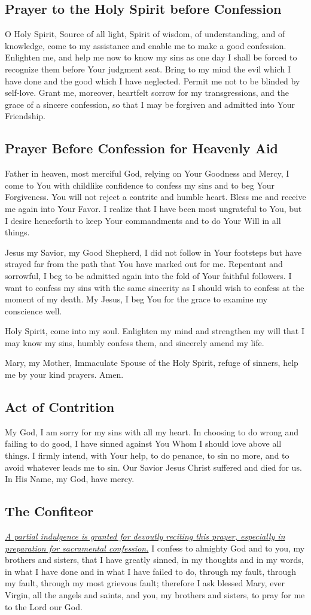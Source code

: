\documentclass[12pt]{article}
\newcommand{\prayertitle}[1]{\subsection{#1}}
\newcommand{\indulgencedprayertitle}[1]{\prayertitle{#1 \protect\kreuz}}
\newcommand{\emphasis}[1]{\emph{#1}}
\newcommand{\emphasis}[1]{\textsl{#1}}
\newcommand{\note}[1]{{\small{\emphasis{#1}}}\newline}
\newcommand{\linkednote}[2]{\hyperlink{#1}{\note{#2}}}
\begin{document}
\prayertitle{Prayer to the Holy Spirit before Confession}
O Holy Spirit, Source of all light, Spirit of wisdom, of understanding, and of knowledge, come to my assistance and enable me to make a good confession.
Enlighten me, and help me now to know my sins as one day I shall be forced to recognize them before Your judgment seat.
Bring to my mind the evil which I have done and the good which I have neglected.
Permit me not to be blinded by self-love.
Grant me, moreover, heartfelt sorrow for my transgressions, and the grace of a sincere confession, so that I may be forgiven and admitted into Your Friendship.

\prayertitle{Prayer Before Confession for Heavenly Aid}
Father in heaven, most merciful God, relying on Your Goodness and Mercy, I come to You with childlike confidence to confess my sins and to beg Your Forgiveness.
You will not reject a contrite and humble heart.
Bless me and receive me again into Your Favor.
I realize that I have been most ungrateful to You, but I desire henceforth to keep Your commandments and to do Your Will in all things.

Jesus my Savior, my Good Shepherd, I did not follow in Your footsteps but have strayed far from the path that You have marked out for me.
Repentant and sorrowful, I beg to be admitted again into the fold of Your faithful followers.
I want to confess my sins with the same sincerity as I should wish to confess at the moment of my death.
My Jesus, I beg You for the grace to examine my conscience well.

Holy Spirit, come into my soul.
Enlighten my mind and strengthen my will that I may know my sins, humbly confess them, and sincerely amend my life.

Mary, my Mother, Immaculate Spouse of the Holy Spirit, refuge of sinners, help me by your kind prayers. Amen.

\prayertitle{Act of Contrition}
My God,
I am sorry for my sins with all my heart.
In choosing to do wrong and failing to do good, I have sinned against You Whom I should love above all things.
I firmly intend, with Your help, to do penance, to sin no more, and to avoid whatever leads me to sin.
Our Savior Jesus Christ suffered and died for us.
In His Name, my God, have mercy.

\indulgencedprayertitle{The Confiteor}
\linkednote{grant9}{A partial indulgence is granted for devoutly reciting this prayer, especially in preparation for sacramental confession.}
I confess to almighty God and to you, my brothers and sisters, that I have greatly sinned, in my thoughts and in my words, in what I have done and in what I have failed to do, through my fault, through my fault, through my most grievous fault;
therefore I ask blessed Mary, ever Virgin, all the angels and saints, and you, my brothers and sisters, to pray for me to the Lord our God.
\end{document}
